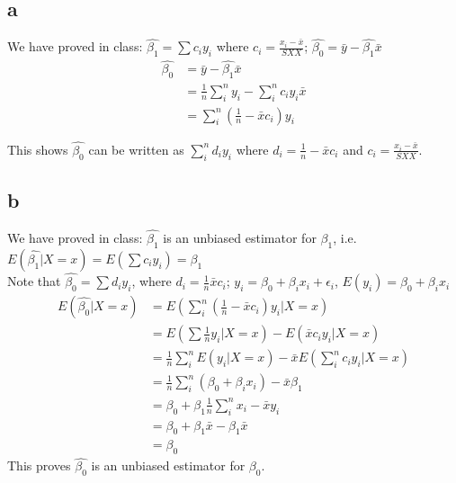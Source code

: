 \documentclass[11pt,letterpaper]{article}
\begin{document}
\subsection*{a}
\noindent We have proved in class: $\hat{\beta_1} = \sum c_i y_i$ where $c_i = \frac{x_i - \bar{x}}{SXX}$; $\hat{\beta_0} = \bar{y} - \hat{\beta_1} \bar{x}$
\begin{align*}
\hat{\beta_0} &= \bar{y} - \hat{\beta_1} \bar{x} \\
&= \frac{1}{n} \sum_i^n y_i - \sum_i^n c_i y_i \bar{x} \\
&= \sum_i^n (\frac{1}{n} - \bar{x} c_i) y_i 
\end{align*}

\noindent This shows $\hat{\beta_0}$ can be written as $\sum_i^n d_i y_i$ where $d_i =  \frac{1}{n} - \bar{x} c_i$ and $c_i = \frac{x_i - \bar{x}}{SXX}$.

\subsection*{b}
We have proved in class: $\hat{\beta_1}$ is an unbiased estimator for $\beta_1$, i.e. $E(\hat{\beta_1}| X=x) = E(\sum c_i y_i) = \beta_1$ \\

\noindent Note that $\hat{\beta_0} = \sum d_i y_i$, where $d_i =  \frac{1}{n} \bar{x} c_i$; $y_i = \beta_0 + \beta_i x_i + \epsilon_i$, $E(y_i) = \beta_0 + \beta_i x_i$
\begin{align*}
E(\hat{\beta_0} | X=x) &= E(\sum_i^n (\frac{1}{n} - \bar{x} c_i) y_i | X=x) \\
&= E(\sum \frac{1}{n} y_i | X=x) - E(\bar{x} c_i y_i | X=x) \\
&= \frac{1}{n} \sum_i^n E(y_i | X=x) - \bar{x} E(\sum_i^n c_i y_i | X=x) \\
&= \frac{1}{n} \sum_i^n (\beta_0 + \beta_i x_i) - \bar{x} \beta_1 \\
&= \beta_0 + \beta_1 \frac{1}{n} \sum_i^n x_i - \bar{x} y_i \\
&= \beta_0 + \beta_1 \bar{x} - \beta_1 \bar{x} \\
&= \beta_0
\end{align*}
\noindent This proves $\hat{\beta_0}$ is an unbiased estimator for $\beta_0$.
\end{document}
